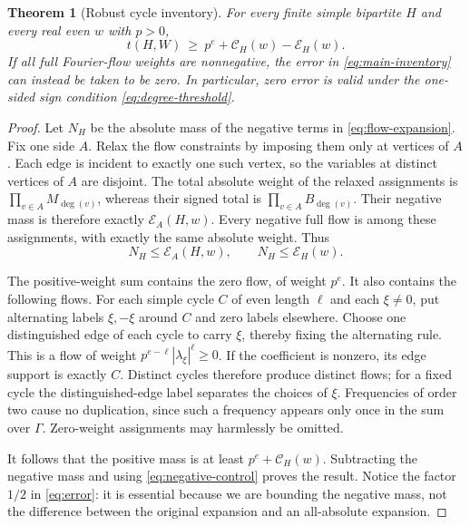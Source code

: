 \documentclass[11pt]{article}
\numberwithin{equation}{section}
\newtheorem{theorem}{Theorem}[section]
\theoremstyle{definition}
\theoremstyle{remark}
\newcommand{\Err}{\mathcal E}
\begin{document}
\begin{theorem}[Robust cycle inventory]
\label{thm:inventory}
For every finite simple bipartite $H$ and every real even $w$ with
$p>0$,
\begin{equation}
 \boxed{\quad
 t(H,W)\ \geq\ p^e+\mathcal C_H(w)-\Err_H(w).
 \quad}
 \label{eq:main-inventory}
\end{equation}
If all full Fourier-flow weights are nonnegative, the error in
\eqref{eq:main-inventory} can instead be taken to be zero. In particular,
zero error is valid under the one-sided sign condition
\eqref{eq:degree-threshold}.
\end{theorem}
\begin{proof}
Let $N_H$ be the absolute mass of the negative terms in
\eqref{eq:flow-expansion}. Fix one side $A$. Relax the flow constraints
by imposing them only at vertices of $A$. Each edge is incident to
exactly one such vertex, so the variables at distinct vertices of $A$
are disjoint. The total absolute weight of the relaxed assignments is
$\prod_{v\in A}M_{\deg(v)}$, whereas their signed total is
$\prod_{v\in A}B_{\deg(v)}$. Their negative mass is therefore exactly
$\Err_A(H,w)$. Every negative full flow is among these assignments,
with exactly the same absolute weight. Thus
\begin{equation}
 N_H\leq\Err_A(H,w),\qquad N_H\leq\Err_H(w).
 \label{eq:negative-control}
\end{equation}

The positive-weight sum contains the zero flow, of weight $p^e$. It
also contains the following flows. For each simple cycle $C$ of even
length $\ell$ and each $\xi\ne0$, put alternating labels
$\xi,-\xi$ around $C$ and zero labels elsewhere. Choose one distinguished
edge of each cycle to carry $\xi$, thereby fixing the alternating rule.
This is a flow of weight
$p^{e-\ell}|\lambda_\xi|^\ell\geq0$. If the coefficient is nonzero,
its edge support is exactly $C$. Distinct cycles therefore produce
distinct flows; for a fixed cycle the distinguished-edge label separates
the choices of $\xi$. Frequencies of order two cause no duplication,
since such a frequency appears only once in the sum over $\Gamma$.
Zero-weight assignments may harmlessly be omitted.

It follows that the positive mass is at least
$p^e+\mathcal C_H(w)$. Subtracting the negative mass and using
\eqref{eq:negative-control} proves the result. Notice the factor $1/2$
in \eqref{eq:error}: it is essential because we are bounding the
negative mass, not the difference between the original expansion and an
all-absolute expansion.
\end{proof}
\end{document}
